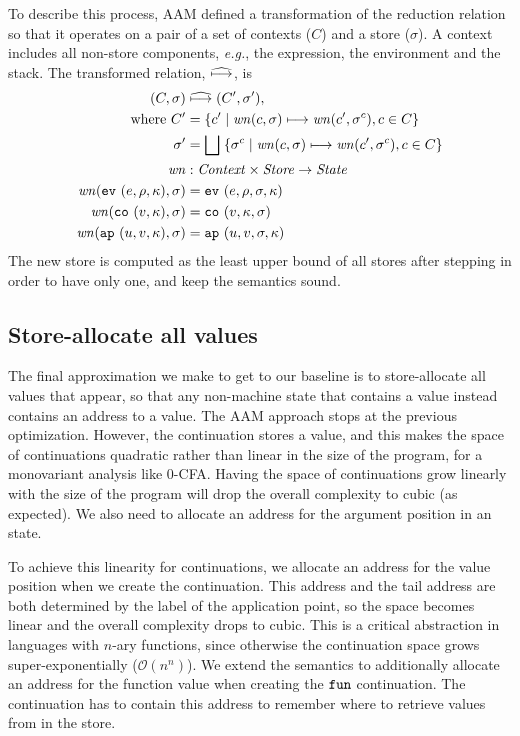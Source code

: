 \documentclass[9pt]{sigplanconf} %
\begin{document}
To describe this process, AAM defined a transformation of the reduction relation so that it operates on
a pair of a set of contexts ($C$) and a store ($\sigma$).
%
A context includes all non-store components, \emph{e.g.}, the expression, the environment and the stack.
%
The transformed relation, $\widehat{\mathbin{\longmapsto}}$, is
%
{\small
\begin{align*}
(C, \sigma) &\mathrel{\widehat{\mathbin{\longmapsto}}} (C', \sigma'), \\
\mbox{where } C' &= \{c' \mid \mathit{wn}(c, \sigma) \mathrel{\mathbin{\longmapsto}} \mathit{wn}(c', \sigma^c), c \in C\} \\
              \sigma' &= \bigsqcup\; \{\sigma^c \mid \mathit{wn}(c,\sigma)\mathrel{\mathbin{\longmapsto}} \mathit{wn}(c', \sigma^c), c \in C\} \\
\mathit{wn} &: \mathit{Context} \times \mathit{Store} \to \mathit{State} \\
\mathit{wn}({\tt ev}{\ }({e, \rho, \kappa}), \sigma) &= {\tt ev}{\ }({e, \rho, \sigma, \kappa}) \\
\mathit{wn}({\tt co}{\ }({v, \kappa}), \sigma) &= {\tt co}{\ }({v, \kappa, \sigma}) \\
\mathit{wn}({\tt ap}{\ }({u, v, \kappa}), \sigma) &= {\tt ap}{\ }({u, v, \sigma, \kappa}) \\
\end{align*}}
%
The new store is computed as the least upper bound of all
stores after stepping in order to have only one, and keep the
semantics sound.

\subsection{Store-allocate all values}
\label{sec:baselineeval}

The final approximation we make to get to our baseline is to
store-allocate all values that appear, so that any non-machine state
that contains a value instead contains an address to a value.  The AAM
approach stops at the previous optimization.  However, the \kfnalone
continuation stores a value, and this makes the space of continuations
quadratic rather than linear in the size of the program, for a
monovariant analysis like 0-CFA.  Having the space of continuations
grow linearly with the size of the program will drop the overall
complexity to cubic (as expected). We also need to allocate an address
for the argument position in an \apalone state.

To achieve this linearity for continuations, we allocate an address
for the value position when we create the continuation.  This address
and the tail address are both determined by the label of the
application point, so the space becomes linear and the overall
complexity drops to cubic.  This is a critical abstraction in
languages with $n$-ary functions, since otherwise the continuation
space grows super-exponentially (${\mathcal O}(n^n)$). We extend the semantics to
additionally allocate an address for the function value when creating
the ${\tt fun}$ continuation. The continuation has to contain this address
to remember where to retrieve values from in the store.
\end{document}
